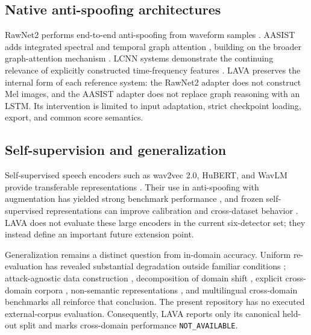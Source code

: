 \documentclass[10pt,journal,onecolumn]{IEEEtran}
\begin{document}
\subsection{Native anti-spoofing architectures}
RawNet2 performs end-to-end anti-spoofing from waveform samples \cite{tak2021rawnet2}. AASIST adds integrated spectral and temporal graph attention \cite{jung2022aasist}, building on the broader graph-attention mechanism \cite{velickovic2018gat}. LCNN systems demonstrate the continuing relevance of explicitly constructed time-frequency features \cite{wu2020lcnn}. LAVA preserves the internal form of each reference system: the RawNet2 adapter does not construct Mel images, and the AASIST adapter does not replace graph reasoning with an LSTM. Its intervention is limited to input adaptation, strict checkpoint loading, export, and common score semantics.

\subsection{Self-supervision and generalization}
Self-supervised speech encoders such as wav2vec 2.0, HuBERT, and WavLM provide transferable representations \cite{baevski2020wav2vec,hsu2021hubert,chen2022wavlm}. Their use in anti-spoofing with augmentation has yielded strong benchmark performance \cite{tak2022wav2vec}, and frozen self-supervised representations can improve calibration and cross-dataset behavior \cite{pascu2024calibrated}. LAVA does not evaluate these large encoders in the current six-detector set; they instead define an important future extension point.

Generalization remains a distinct question from in-domain accuracy. Uniform re-evaluation has revealed substantial degradation outside familiar conditions \cite{muller2022generalize}; attack-agnostic data construction \cite{kawa2022attack}, decomposition of domain shift \cite{muller2024harder}, explicit cross-domain corpora \cite{li2024crossdomain}, non-semantic representations \cite{das2025nonsemantic}, and multilingual cross-domain benchmarks \cite{ciobanu2026xmad} all reinforce that conclusion. The present repository has no executed external-corpus evaluation. Consequently, LAVA reports only its canonical held-out split and marks cross-domain performance \texttt{NOT\_AVAILABLE}.
\end{document}
